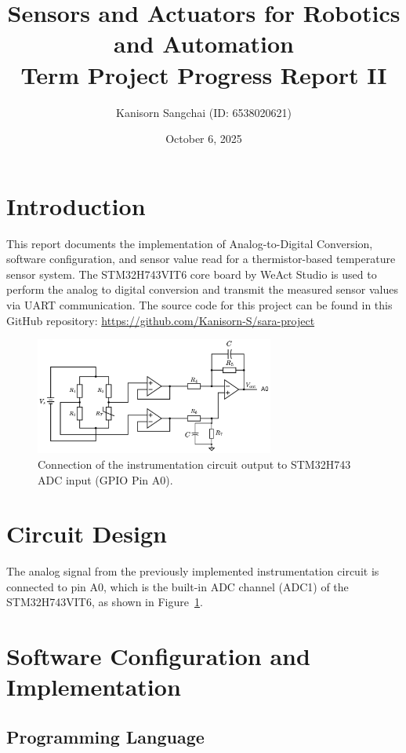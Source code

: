 \documentclass[12pt,a4paper]{article}
\title{Sensors and Actuators for Robotics and
Automation\\Term Project Progress Report II}
\author{Kanisorn Sangchai (ID: 6538020621)}
\date{October 6, 2025}
\begin{document}
\maketitle

\section{Introduction}
This report documents the implementation of Analog-to-Digital Conversion, software configuration, and sensor value read for a thermistor-based temperature sensor system. The STM32H743VIT6 core board by WeAct Studio is used to perform the analog to digital conversion and transmit the measured sensor values via UART communication. The source code for this project can be found in this GitHub repository: \url{https://github.com/Kanisorn-S/sara-project}

\begin{figure}[h]
    \centering
    \includegraphics[width=0.7\textwidth]{images/circuit_diagram.png}
    \caption{Connection of the instrumentation circuit output to STM32H743 ADC input (GPIO Pin A0).}
    \label{fig:circuit}
\end{figure}

\section{Circuit Design}
The analog signal from the previously implemented instrumentation circuit is connected to pin A0, which is the built-in ADC channel (ADC1) of the STM32H743VIT6, as shown in Figure~\ref{fig:circuit}.  

\section{Software Configuration and Implementation}

\subsection{Programming Language}
\end{document}
